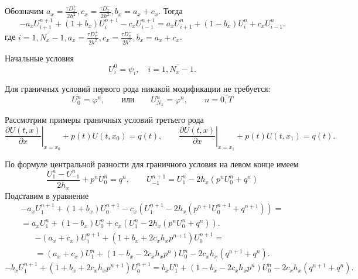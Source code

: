 \documentclass[a4paper,12pt]{article}
\begin{document}
Обозначим  $a_x = \frac{\tau D^+_x}{2h^2}, c_x = \frac{\tau D^-_x}{2h^2}, b_x = a_x + c_x$. Тогда
\begin{equation}
  \label{eq:1d-scheme}
  - a_x U^{n+1}_{i+1} + \left(1 + b_x \right) U^{n+1}_{i} - c_x U^{n+1}_{i-1} = a_x U^{n}_{i+1} + \left(1 - b_x \right) U^{n}_{i} + c_x U^{n}_{i-1}.
\end{equation}
где $i = \overline{1, N_x-1}, a_x = \frac{\tau D^+_x}{2h^2}, c_x = \frac{\tau D^-_x}{2h^2}, b_x = a_x + c_x$.

Начальные условия
\begin{equation}
  \label{eq:ic}
  U^0_i = \psi_i, \quad i = \overline {1, N_x-1}.
\end{equation}

Для граничных условий первого рода никакой модификации не требуется:
\begin{equation}
  \label{eq:1d-bc1}
  U^n_0 = \varphi^n, \qquad \mbox{или} \qquad U^n_{N_x} = \varphi^n, \qquad n = \overline{0,T}
\end{equation}

Рассмотрим примеры граничных условий третьего рода
\begin{equation*}
  \left. \frac{ \partial U(t,x) }{\partial x} \right|_{x = x_0} +
  p(t) U(t, x_0) = q(t), \qquad
  \left. \frac{ \partial U(t, x) }{\partial x} \right|_{x = x_1} +
  p(t) U(t, x_1) = q(t).
\end{equation*}

По формуле центральной разности для граничного условия на левом конце имеем
\begin{equation*}
  \frac{U^{n}_{1} -  U^{n}_{-1}}{2 h_x} + p^n U^n_{0}  = q^{n}, \qquad
  U^{n+1}_{-1}  = U^{n}_{1} - 2 h_x \left( p^n U^n_{0} + q^{n} \right)
\end{equation*}
Подставим в уравнение
\begin{multline*}
  - a_x U^{n+1}_{1} + \left( 1 + b_x  \right) U^{n+1}_{0} - c_x \left( U^{n+1}_{1} - 2 h_x (p^{n+1} U^{n+1}_{0} + q^{n+1}) \right) = \\
  = a_x U^{n}_{1} + \left(1 - b_x \right) U^{n}_{0} + c_x \left(  U^{n}_{1} - 2 h_x (p^n U^{n}_{0} + q^{n}) \right).
\end{multline*}
\begin{multline*}
  - (a_x + c_x) U^{n+1}_{1} + \left( 1 + b_x + 2 c_x h_x p^{n+1} \right) U^{n+1}_{0} = \\
  = (a_x + c_x) U^{n}_{1} + \left(1 - b_x - 2 c_x h_x p^n \right) U^{n}_{0} - 2 c_x h_x (q^{n+1} + q^{n}).
\end{multline*}
\begin{equation}
  - b_x U^{n+1}_{1} + \left( 1 + b_x  + 2 c_x h_x p^{n+1} \right) U^{n+1}_{0} =
  b_x U^{n}_{1} + \left(1 - b_x - 2 c_x h_x p^n \right) U^{n}_{0} - 2 c_x h_x (q^{n+1} + q^{n}).
\end{equation}
\end{document}
